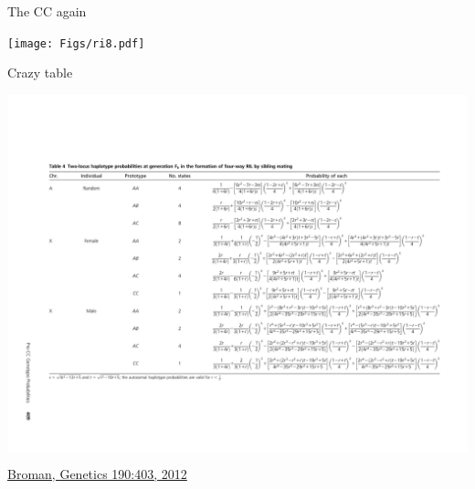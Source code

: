 \documentclass[12pt]{article}
\newcommand{\citesize}{\fontsize{14}{18} \selectfont}
\newcommand{\headsize}{\fontsize{35}{35} \selectfont}
\begin{document}
{\vspace*{5mm}

\newpage


\headsize \color{myyellow}
\hfill \begin{minipage}{5.75in}
\centering
The CC again
\end{minipage}

\vfill

\centerline{\texttt{[image: Figs/ri8.pdf]}}


\newpage


\headsize \color{myyellow}
\hfill \begin{minipage}{5.75in}
\centering
Crazy table
\end{minipage}

\vspace{20mm}

\centerline{\colorbox{white}{\includegraphics[width=9in]{Figs/preCC_hap_prob_table.pdf}}}


\vfill

\hfill {\citesize \color{citecolor} \href{http://www.genetics.org/content/190/2/403.full}{Broman, Genetics
190:403, 2012}}

\vspace*{5mm}



\newpage


}
\end{document}
